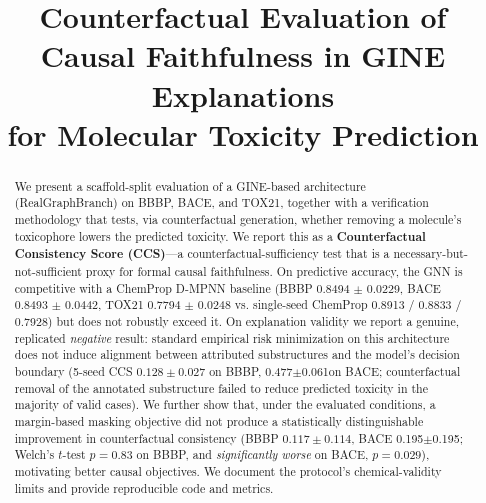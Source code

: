 \documentclass[conference]{IEEEtran}
\newcommand{\BBBPauc}{0.8494}
\newcommand{\BBBPaucsd}{0.0229}
\newcommand{\BACEauc}{0.8493}
\newcommand{\BACEaucsd}{0.0442}
\newcommand{\TOXauc}{0.7794}
\newcommand{\TOXaucsd}{0.0248}
\newcommand{\ChemBBBP}{0.8913}
\newcommand{\ChemBACE}{0.8833}
\newcommand{\ChemTOX}{0.7928}
\newcommand{\BACEcausalstd}{0.477}
\newcommand{\BACEcausalstdsd}{0.061} %
\newcommand{\BACEcausalreg}{0.195}
\newcommand{\BACEcausalregsd}{0.195} %
\begin{document}
\title{Counterfactual Evaluation of Causal Faithfulness in GINE Explanations\\for Molecular Toxicity Prediction}

\author{
\and
{}
}
\maketitle

\begin{abstract}
We present a scaffold-split evaluation of a GINE-based architecture (RealGraphBranch) on BBBP, BACE, and TOX21, together with a verification methodology that tests, via counterfactual generation, whether removing a molecule's toxicophore lowers the predicted toxicity. We report this as a \textbf{Counterfactual Consistency Score (CCS)}---a counterfactual-sufficiency test that is a necessary-but-not-sufficient proxy for formal causal faithfulness.
On predictive accuracy, the GNN is competitive with a ChemProp D-MPNN baseline (BBBP \BBBPauc{} $\pm$ \BBBPaucsd, BACE \BACEauc{} $\pm$ \BACEaucsd, TOX21 \TOXauc{} $\pm$ \TOXaucsd{} vs. single-seed ChemProp \ChemBBBP{} / \ChemBACE{} / \ChemTOX) but does not robustly exceed it. On explanation validity we report a genuine, replicated \emph{negative} result: standard empirical risk minimization on this architecture does not induce alignment between attributed substructures and the model's decision boundary (5-seed CCS $0.128\pm0.027$ on BBBP, \BACEcausalstd$\pm$\BACEcausalstdsd on BACE; counterfactual removal of the annotated substructure failed to reduce predicted toxicity in the majority of valid cases). We further show that, under the evaluated conditions, a margin-based masking objective did not produce a statistically distinguishable improvement in counterfactual consistency (BBBP $0.117\pm0.114$, BACE \BACEcausalreg$\pm$\BACEcausalregsd; Welch's $t$-test $p=0.83$ on BBBP, and \emph{significantly worse} on BACE, $p=0.029$), motivating better causal objectives. We document the protocol's chemical-validity limits and provide reproducible code and metrics.
\end{abstract}
\end{document}
